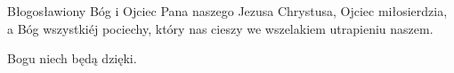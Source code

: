 Błogosławiony Bóg i Ojciec Pana naszego Jezusa Chrystusa, Ojciec miłosierdzia, a Bóg wszystkiéj pociechy, który nas cieszy we wszelakiem utrapieniu naszem.

\rubric{\Rbar}Bogu niech będą dzięki.
